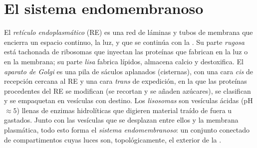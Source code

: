 \section{El sistema endomembranoso}

\begin{definition}\label{def:b1:eukaryotic-cell:endomembrane}
El \emph{retículo endoplasmático} (RE) es una
red de láminas y tubos de membrana que encierra un espacio continuo, la luz,
y que se continúa con la . Su parte
\emph{rugosa} está tachonada de
ribosomas que inyectan las proteínas que fabrican en la luz o en la
membrana; su parte \emph{lisa} fabrica
lípidos, almacena calcio y destoxifica. El \emph{aparato de
Golgi} es una pila de sáculos aplanados (cisternas),
con una cara \emph{cis} de recepción cercana al RE y una cara \emph{trans}
de expedición, en la que las proteínas procedentes del RE se modifican (se
recortan y se añaden azúcares), se clasifican y se empaquetan en vesículas
con destino. Los \emph{lisosomas} son vesículas ácidas (pH
$\approx 5$) llenas de enzimas hidrolíticas que digieren material traído de
fuera u  gastados. Junto con las vesículas que se desplazan entre
ellos y la membrana plasmática, todo esto forma el \emph{sistema
endomembranoso}: un conjunto conectado de
compartimentos cuyas luces son, topológicamente, el exterior de la .
\end{definition}

